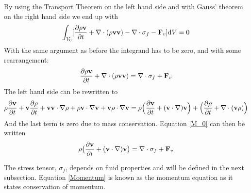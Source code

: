By using the Transport Theorem on the left hand side and with Gauss' theorem on the right hand side we end up with
\begin{align*} \int_{V_0} [ \frac{\partial \rho \mathbf{v}}{\partial t} + \nabla \cdot (\rho \mathbf{v}\mathbf{v} ) - \nabla \cdot \sigma_f - \mathbf{F}_v] \mathrm{d}V = 0
\end{align*}
With the same argument as before the integrand has to be zero, and with some rearrangement:
\begin{align}
\frac{\partial \rho \mathbf{v}}{\partial t} + \nabla \cdot (\rho \mathbf{v}\mathbf{v} ) = \nabla \cdot \sigma_f + \mathbf{F}_v \label{M_0}
\end{align} 
The left hand side can be rewritten to
\begin{align}
\rho \frac{\partial \mathbf{v}}{\partial t} + \mathbf{v} \frac{\partial \rho}{\partial t} + \mathbf{v} \mathbf{v} \cdot \nabla \rho + \rho \mathbf{v} \cdot \nabla \mathbf{v} + \mathbf{v}\rho \cdot \nabla \mathbf{v} = \rho\Big{(}\frac{\partial \mathbf{v}}{\partial t} + (\mathbf{v} \cdot \nabla ) \mathbf{v} \Big{)} + \Big{(}\frac{\partial \rho}{\partial t} + \nabla \cdot (\mathbf{v} \rho)\Big{)}
\end{align}
And the last term is zero due to mass conservation. Equation \eqref{M_0} can then be written
\begin{align}
\rho \big{(}\frac{\partial \mathbf{v}}{\partial t} + (\mathbf{v} \cdot \nabla ) \mathbf{v} \big{)} = \nabla \cdot \sigma_f + \mathbf{F}_v \label{Momentum}
\end{align} 

The stress tensor, $\sigma_f$, depends on fluid properties and will be defined in the next subsection. Equation \eqref{Momentum} is known as the momentum equation as it states conservation of momentum.
